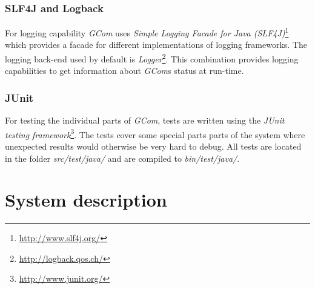 \documentclass[titlepage, twocolumn, a4paper, 10pt]{article}
\begin{document}
\subsubsection{SLF4J and Logback}\label{sec:logback}
For logging capability \textit{GCom} uses \textit{Simple Logging
  Facade for Java (SLF4J)}\footnote{\url{http://www.slf4j.org/}} which
provides a facade for different implementations of logging frameworks.
The logging back-end used by default is
\textit{Logger}\footnote{\url{http://logback.qos.ch/}}. This
combination provides logging capabilities to get information about
\textit{GCom}s status at run-time.

\subsubsection{JUnit}\label{sec:junit}
For testing the individual parts of \textit{GCom}, tests are written
using the \textit{JUnit testing
  framework}\footnote{\url{http://www.junit.org/}}. The tests cover
some special parts parts of the system where unexpected results would
otherwise be very hard to debug. All tests are located in the folder
\textit{src/test/java/} and are compiled to \textit{bin/test/java/}.

\section{System description}\label{sec:system}


\end{document}
